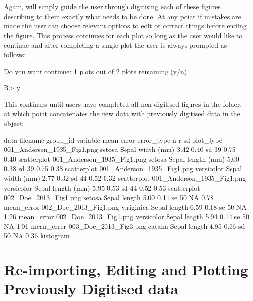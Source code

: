 \documentclass[article]{jss}
\newcommand{\fct}[1]{\code{#1()}}
\begin{document}
Again, \fct{metaDigitise} will simply guide the user through digitising each of these figures describing to them exactly what needs to be done. At any point if mistakes are made the user can choose relevant options to edit or correct things before ending the figure. This process continues for each plot so long as the user would like to continue and after completing a single plot the user is always prompted as follows:

\begin{CodeChunk}
\begin{CodeOutput}
Do you want continue: 1 plots out of 2 plots remaining (y/n)
\end{CodeOutput}
\begin{CodeInput}
R> y
\end{CodeInput}
\end{CodeChunk}

This continues until users have completed all non-digitised figures in the folder, at which point \fct{metaDigitise} concatenates the new data with previously digitised data in the object:

\begin{CodeChunk}
\begin{CodeOutput}
data
                  filename    group_id         variable   mean  error error_type n    r    sd   plot_type
001_Anderson_1935_Fig1.png      setosa  Sepal width (mm)  3.42  0.40  sd        39  0.75  0.40  scatterplot
001_Anderson_1935_Fig1.png      setosa  Sepal length (mm) 5.00  0.38  sd        39  0.75  0.38  scatterplot
001_Anderson_1935_Fig1.png  versicolor  Sepal width (mm)  2.77  0.32  sd        44  0.52  0.32  scatterplot
001_Anderson_1935_Fig1.png  versicolor  Sepal length (mm) 5.95  0.53  sd        44  0.52  0.53  scatterplot
     002_Doe_2013_Fig1.png      setosa  Sepal length      5.00  0.11  se        50  NA    0.78  mean_error
     002_Doe_2013_Fig1.png  viriginica  Sepal length      6.59  0.18  se        50  NA    1.26  mean_error
     002_Doe_2013_Fig1.png  versicolor  Sepal length      5.94  0.14  se        50  NA    1.01  mean_error
     003_Doe_2013_Fig3.png      catana  Sepal length      4.95  0.36  sd        50  NA    0.36  histogram
\end{CodeOutput}
\end{CodeChunk}


\section{Re-importing, Editing and Plotting Previously Digitised data}
\end{document}
